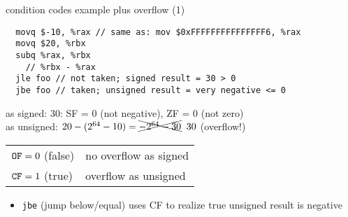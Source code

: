 \begin{frame}[fragile,label=ccEx1OF]{condition codes example plus overflow (1)}
\begin{lstlisting}
  movq $-10, %rax // same as: mov $0xFFFFFFFFFFFFFFF6, %rax
  movq $20, %rbx
  subq %rax, %rbx
    // %rbx - %rax
  jle foo // not taken; signed result = 30 > 0
  jbe foo // taken; unsigned result = very negative <= 0
\end{lstlisting}
as signed: 30: SF = 0 (not negative), ZF = 0 (not zero) \\
as unsigned: $20 - (2^{64} - 10) = \xcancel{-2^{64} - 30}\;\;30$ (overflow!) \\
\begin{tabular}{ll}
$\mathtt{OF} = 0$ (false) & no overflow as signed \\
$\mathtt{CF} = 1$ (true) & overflow as unsigned \\
\end{tabular}
\begin{itemize}
\item \texttt{jbe} (jump below/equal) uses CF to realize true unsigned result is negative
\end{itemize}
\end{frame}


